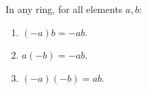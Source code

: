 In any ring, for all elements $a, b$:
\begin{enumerate}
\item $(-a)b = -ab$.
\item $a(-b) = -ab$.
\item $(-a)(-b) = ab$.
\end{enumerate}
